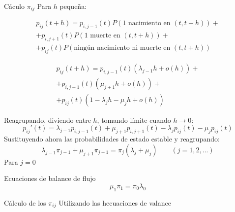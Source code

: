 \begin{frame}{Cáculo $\pi_{ij}$}
	Para $h$ pequeña: \pause
	
	\begin{equation*}
	\begin{split}
	p_{ij}(t+h)= p_{i,j-1}(t)P(\textrm{1 nacimiento en } (t,t+h))+\\
	+ p_{i,j+1}(t)P(\textrm{1 muerte en }(t,t+h))+\\
	+ p_{ij}(t)P(\textrm{ningún nacimiento ni muerte en }(t,t+h))
	\end{split}
	\end{equation*}
	\pause
	
	\begin{equation*}
	\begin{split}
	p_{ij}(t+h)= p_{i,j-1}(t)(\lambda_{j-1}h + o(h))+\\
	+ p_{i,j+1}(t)(\mu_{j+1}h + o(h))+\\
	+ p_{ij}(t)(1-\lambda_{j}h - \mu_{j}h + o(h) )
	\end{split}
	\end{equation*}
	
\end{frame}

\begin{frame}
	Reagrupando, diviendo entre $h$, tomando límite cuando $h \longrightarrow 0$:
	\pause
	\begin{equation*}
	p_{ij}'(t)= \lambda_{j-1} p_{i,j-1}(t) + \mu_{j+1}  p_{i,j+1}(t) - \lambda_j  p_{ij}(t) - \mu_{j} p_{ij}(t)
	\end{equation*}
	\pause
	Sustituyendo ahora las probabilidades de estado estable y reagrupando:
	\pause
	\begin{equation*}
	\lambda_{j-1} \pi_{j-1} + \mu_{j+1}  \pi_{j+1} = \pi_j(\lambda_j + \mu_j) \qquad (j= 1,2,...) \label{eq1}
	\end{equation*} 
	\pause
	Para $j=0$
	\pause
	\begin{block}{Ecuaciones de balance de flujo}
		\begin{equation*}
		\mu_1 \pi_1 = \pi_0 \lambda_0
		\label{eq2}
		\end{equation*}
	\end{block}
\end{frame}

\begin{frame}{Cálculo de los $\pi_{ij}$}
	Utilizando las hecuaciones de valance
\end{frame}

